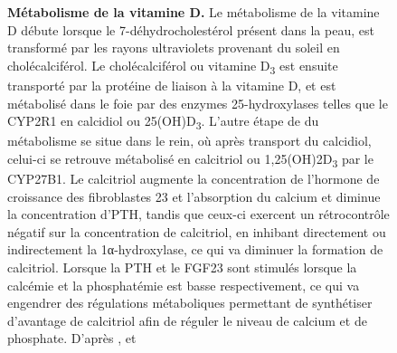 \documentclass[
  a4paper,
  DIV=11,
  numbers=noendperiod,
  listof=totoc]{scrreprt}
\begin{document}
\begin{figure}


\caption[Métabolisme de la vitamine
D.]{\label{fig-vitd-metabolism}\textbf{Métabolisme de la vitamine D.} Le
métabolisme de la vitamine D débute lorsque le 7-déhydrocholestérol
présent dans la peau, est transformé par les rayons ultraviolets
provenant du soleil en cholécalciférol. Le cholécalciférol ou vitamine
D\textsubscript{3} est ensuite transporté par la protéine de liaison à
la vitamine D, et est métabolisé dans le foie par des enzymes
25-hydroxylases telles que le CYP2R1 en calcidiol ou
25(OH)D\textsubscript{3}. L'autre étape de du métabolisme se situe dans
le rein, où après transport du calcidiol, celui-ci se retrouve
métabolisé en calcitriol ou 1,25(OH)2D\textsubscript{3} par le CYP27B1.
Le calcitriol augmente la concentration de l'hormone de croissance des
fibroblastes 23  et l'absorption du calcium et diminue la
concentration d'\acf{PTH}, tandis que ceux-ci exercent un rétrocontrôle
négatif sur la concentration de calcitriol, en inhibant directement ou
indirectement la 1α-hydroxylase, ce qui va diminuer la formation de
calcitriol. Lorsque la PTH et le FGF23 sont stimulés lorsque la calcémie
et la phosphatémie est basse respectivement, ce qui va engendrer des
régulations métaboliques permettant de synthétiser d'avantage de
calcitriol afin de réguler le niveau de calcium et de phosphate. D'après
\textcite{Christakos.2010}, \textcite{Tsiaras.2011} et
\textcite{Dankers.2017}}

\end{figure}%
\end{document}
